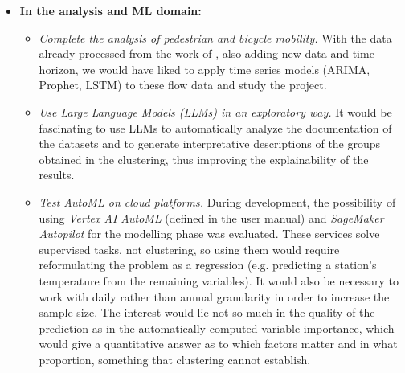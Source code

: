 \begin{itemize}
\begin{itemize}
		\item \emph{Test distributed and real-time processing.} Using services such as AWS Glue (Spark) or Dataproc in GCP, as well as real-time analysis tools, to check the usefulness of real-time data would be a great point to expand on in the project.
		
		\item \emph{Complete the serverless deployment.} In this work, both Cloud Run and Cloud Functions were discarded; with additional configuration it is technically viable, and it would be worth trying in a next iteration.
		
		\item \emph{Build an interactive dashboard for the results.} So that other researchers or the general public could explore the data and conclusions in a visual and intuitive way, it would be very useful to develop an interface with native cloud tools such as a managed \textit{Apache Superset} or \textit{Looker Studio}.
	\end{itemize}
	
	\item \textbf{In the analysis and ML domain:}
	\begin{itemize}
		\item \emph{Complete the analysis of pedestrian and bicycle mobility.} With the data already processed from the work of \citep{SaizSantos2023}, also adding new data and time horizon, we would have liked to apply time series models (ARIMA, Prophet, LSTM) to these flow data and study the project.
		
		\item \emph{Use Large Language Models (LLMs) in an exploratory way.} It would be fascinating to use LLMs to automatically analyze the documentation of the datasets and to generate interpretative descriptions of the groups obtained in the clustering, thus improving the explainability of the results.
		
		\item \emph{Test AutoML on cloud platforms.} During development, the possibility of using \textit{Vertex AI AutoML} (defined in the user manual) and \textit{SageMaker Autopilot} for the modelling phase was evaluated. These services solve supervised tasks, not clustering, so using them would require reformulating the problem as a regression (e.g. predicting a station's temperature from the remaining variables). It would also be necessary to work with daily rather than annual granularity in order to increase the sample size. The interest would lie not so much in the quality of the prediction as in the automatically computed variable importance, which would give a quantitative answer as to which factors matter and in what proportion, something that clustering cannot establish.
		

\end{itemize}
\end{itemize}
